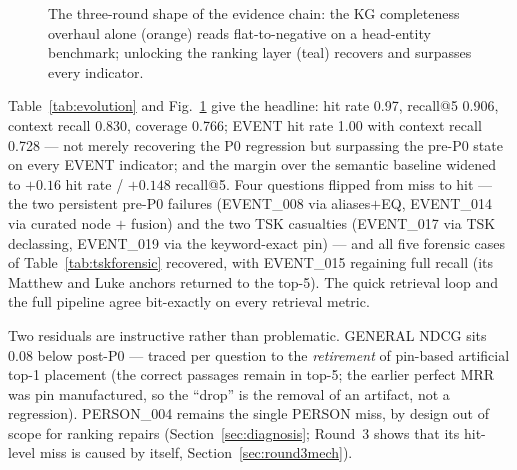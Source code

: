 \begin{figure}[!t]
\centering
{}
\caption{The three-round shape of the evidence chain: the KG
completeness overhaul alone (orange) reads flat-to-negative on a
head-entity benchmark; unlocking the ranking layer (teal) recovers and
surpasses every indicator.}
\label{fig:evolution}
\end{figure}

Table~\ref{tab:evolution} and Fig.~\ref{fig:evolution} give the
headline: hit rate 0.97, recall@5 0.906, context recall 0.830, coverage
0.766; EVENT hit rate 1.00 with context recall 0.728 --- not merely
recovering the P0 regression but surpassing the pre-P0 state on every
EVENT indicator; and the margin over the semantic baseline widened to
$+0.16$ hit rate / $+0.148$ recall@5. Four questions flipped
from miss to hit --- the two persistent pre-P0 failures (EVENT\_008 via
aliases$+$EQ, EVENT\_014 via curated node $+$ fusion) and the two TSK
casualties (EVENT\_017 via TSK declassing, EVENT\_019 via the
keyword-exact pin) --- and all five forensic cases of
Table~\ref{tab:tskforensic} recovered, with EVENT\_015 regaining full
recall (its Matthew and Luke anchors returned to the top-5). The quick retrieval loop and
the full pipeline agree bit-exactly on every retrieval metric.

Two residuals are instructive rather than problematic. GENERAL NDCG sits
$0.08$ below post-P0 --- traced per question to the \emph{retirement} of
pin-based artificial top-1 placement (the correct passages remain in
top-5; the earlier perfect MRR was pin manufactured, so the ``drop'' is
the removal of an artifact, not a regression). PERSON\_004 remains the
single PERSON miss, by design out of scope for ranking repairs
(Section~\ref{sec:diagnosis}; Round~3 shows that its hit-level miss is
caused by  itself, Section~\ref{sec:round3mech}).

